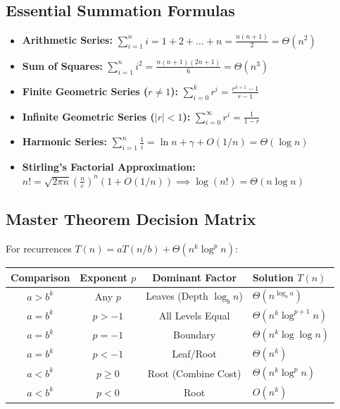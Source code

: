 \documentclass[11pt,a4paper]{article}
\begin{document}
\subsection{Essential Summation Formulas}
\begin{itemize}[itemsep=3pt]
    \item \textbf{Arithmetic Series:} $\sum_{i=1}^n i = 1 + 2 + \dots + n = \frac{n(n+1)}{2} = \Theta(n^2)$
    \item \textbf{Sum of Squares:} $\sum_{i=1}^n i^2 = \frac{n(n+1)(2n+1)}{6} = \Theta(n^3)$
    \item \textbf{Finite Geometric Series ($r \neq 1$):} $\sum_{i=0}^k r^i = \frac{r^{k+1} - 1}{r - 1}$
    \item \textbf{Infinite Geometric Series ($|r| < 1$):} $\sum_{i=0}^{\infty} r^i = \frac{1}{1 - r}$
    \item \textbf{Harmonic Series:} $\sum_{i=1}^n \frac{1}{i} = \ln n + \gamma + O(1/n) = \Theta(\log n)$
    \item \textbf{Stirling's Factorial Approximation:} $n! = \sqrt{2\pi n} \left(\frac{n}{e}\right)^n \left(1 + O(1/n)\right) \implies \log(n!) = \Theta(n \log n)$
\end{itemize}

\subsection{Master Theorem Decision Matrix}
For recurrences $T(n) = a T(n/b) + \Theta(n^k \log^p n)$:
\begin{center}
\begin{tabularx}{\textwidth}{c c c X}
\toprule
\textbf{Comparison} & \textbf{Exponent $p$} & \textbf{Dominant Factor} & \textbf{Solution $T(n)$} \\
\midrule
$a > b^k$ & Any $p$ & Leaves ($\text{Depth } \log_b n$) & $\Theta(n^{\log_b a})$ \\
\midrule
$a = b^k$ & $p > -1$ & All Levels Equal & $\Theta(n^k \log^{p+1} n)$ \\
$a = b^k$ & $p = -1$ & Boundary & $\Theta(n^k \log \log n)$ \\
$a = b^k$ & $p < -1$ & Leaf/Root & $\Theta(n^k)$ \\
\midrule
$a < b^k$ & $p \ge 0$ & Root (Combine Cost) & $\Theta(n^k \log^p n)$ \\
$a < b^k$ & $p < 0$ & Root & $O(n^k)$ \\
\bottomrule
\end{tabularx}
\end{center}
\end{document}
